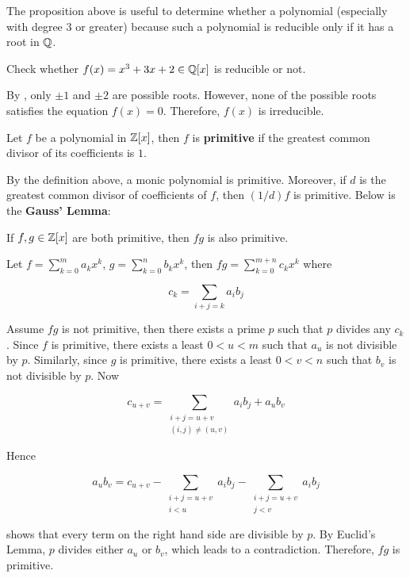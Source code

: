 \documentclass[a4paper,12pt]{article}
\begin{document}
The proposition above is useful to determine whether a polynomial (especially with degree $3$ or greater) because such a polynomial is reducible only if it has a root in $\mathbb{Q}$.\n

\begin{exm}
  Check whether $f(x)=x^{3}+3x+2\in\mathbb{Q}[x]$ is reducible or not.\n

  \ans By \rpst[\sctr{1}], only $\pm 1$ and $\pm 2$ are possible roots. However, none of the possible roots satisfies the equation $f(x)=0$. Therefore, $f(x)$ is irreducible.
\end{exm}\n

\begin{dft}
  Let $f$ be a polynomial in $\mathbb{Z}[x]$, then $f$ is \textbf{primitive} if the greatest common divisor of its coefficients is $1$.
\end{dft}\n

By the definition above, a monic polynomial is primitive. Moreover, if $d$ is the greatest common divisor of coefficients of $f$, then $(1/d)f$ is primitive. Below is the \textbf{Gauss' Lemma}:\n

\begin{pst}
  If $f,g\in\mathbb{Z}[x]$ are both primitive, then $fg$ is also primitive.\n

  \prf Let $f=\sum_{k=0}^{m}a_{k}x^{k}$, $g=\sum_{k=0}^{n}b_{k}x^{k}$, then $fg=\sum_{k=0}^{m+n}c_{k}x^{k}$ where

  $$c_{k}=\sum_{i+j=k}a_{i}b_{j}$$\s

  Assume $fg$ is not primitive, then there exists a prime $p$ such that $p$ divides any $c_{k}$. Since $f$ is primitive, there exists a least $0<u<m$ such that $a_{u}$ is not divisible by $p$. Similarly, since $g$ is primitive, there exists a least $0<v<n$ such that $b_{v}$ is not divisible by $p$. Now

  $$c_{u+v}=\sum_{\substack{i+j=u+v\\(i,j)\neq(u,v)}}a_{i}b_{j}+a_{u}b_{v}$$\s

  Hence

  $$a_{u}b_{v}=c_{u+v}-\sum_{\substack{i+j=u+v\\i<u}}a_{i}b_{j}-\sum_{\substack{i+j=u+v\\j<v}}a_{i}b_{j}$$\s

  shows that every term on the right hand side are divisible by $p$. By Euclid's Lemma, $p$ divides either $a_{u}$ or $b_{v}$, which leads to a contradiction. Therefore, $fg$ is primitive.
\end{pst}\n
\end{document}

